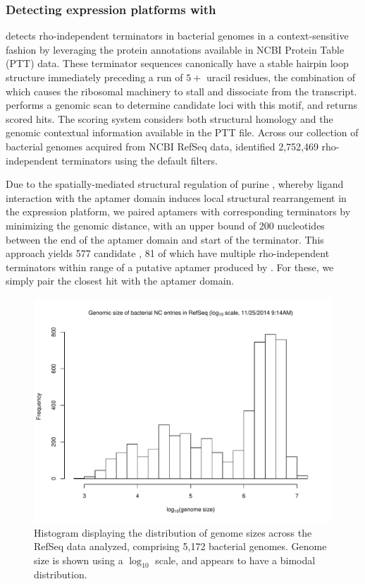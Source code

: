 \subsubsection{Detecting expression platforms with \tthp}
\label{subsubsec:rfinder:tthp}

\tthp \citep{ermolaeva:2000cl} detects rho-independent terminators in bacterial
genomes in a context-sensitive fashion by leveraging the protein annotations
available in NCBI Protein Table (PTT) data. These terminator sequences canonically have a stable
hairpin loop structure immediately preceding a run of $5+$ uracil residues, the
combination of which causes the ribosomal machinery to stall and dissociate from
the transcript. \tthp performs a genomic scan to determine candidate loci with
this motif, and returns scored hits. The scoring system considers both structural
homology and the genomic contextual information available in the PTT file. Across
our collection of bacterial genomes acquired from NCBI RefSeq data, \tthp
identified 2,752,469 rho-independent terminators using the default filters.

Due to the spatially-mediated structural regulation of purine \rbs,
whereby ligand interaction with the aptamer domain induces local structural
rearrangement in the expression platform, we paired aptamers with corresponding
terminators by minimizing the genomic distance, with an upper bound of 200
nucleotides between the end of the aptamer domain and start of the terminator.
This approach yields 577 candidate \rbs, 81 of which have multiple
rho-independent terminators within range of a putative aptamer produced by
\infernal. For these, we simply pair the closest \tthp hit with the aptamer domain.

\begin{figure}[!ht]
\centering
\includegraphics[width=.9\textwidth]{Figures/Ribofinder/refseqGenomeSizes.pdf}
\caption[Histogram displaying the distribution of genome sizes across RefSeq]{Histogram displaying the distribution of genome sizes across the RefSeq
data analyzed, comprising 5,172 bacterial genomes. Genome size is shown using a
$\log_{10}$ scale, and appears to have a bimodal distribution.}
\label{fig:rfinder:genomeSizes}
\end{figure}

